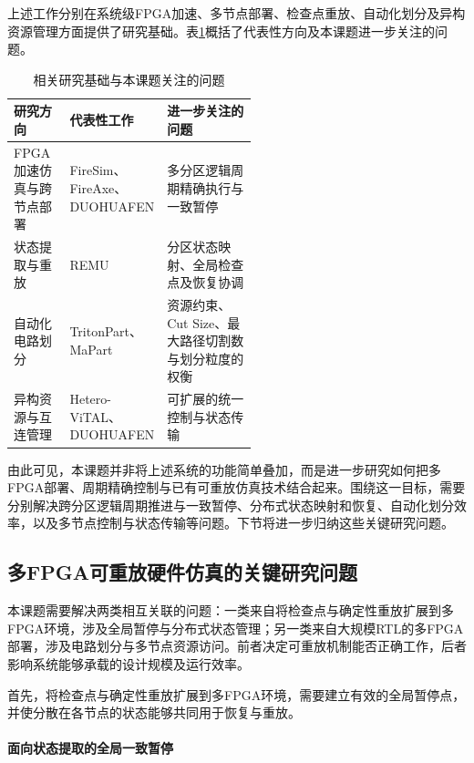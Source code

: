 上述工作分别在系统级FPGA加速、多节点部署、检查点重放、自动化划分及异构资源管理方面提供了研究基础。表\ref{tab:midterm-related-work}概括了代表性方向及本课题进一步关注的问题。

\begin{table}[htbp]
    \centering
    \caption{相关研究基础与本课题关注的问题}
    \label{tab:midterm-related-work}
    \small
    \renewcommand{\arraystretch}{1.25}
    \begin{tabularx}{\linewidth}{@{}>{\raggedright\arraybackslash}p{0.23\linewidth}>{\raggedright\arraybackslash}p{0.30\linewidth}>{\raggedright\arraybackslash}X@{}}
        \toprule
        研究方向 & 代表性工作 & 进一步关注的问题 \\
        \midrule
        FPGA加速仿真与跨节点部署 & FireSim、FireAxe、DUOHUAFEN & 多分区逻辑周期精确执行与一致暂停 \\
        状态提取与重放 & REMU & 分区状态映射、全局检查点及恢复协调 \\
        自动化电路划分 & TritonPart、MaPart & 资源约束、Cut Size、最大路径切割数与划分粒度的权衡 \\
        异构资源与互连管理 & Hetero-ViTAL、DUOHUAFEN & 可扩展的统一控制与状态传输 \\
        \bottomrule
    \end{tabularx}
\end{table}

由此可见，本课题并非将上述系统的功能简单叠加，而是进一步研究如何把多FPGA部署、周期精确控制与已有可重放仿真技术结合起来。围绕这一目标，需要分别解决跨分区逻辑周期推进与一致暂停、分布式状态映射和恢复、自动化划分效率，以及多节点控制与状态传输等问题。下节将进一步归纳这些关键研究问题。

\subsection{多FPGA可重放硬件仿真的关键研究问题}

本课题需要解决两类相互关联的问题：一类来自将检查点与确定性重放扩展到多FPGA环境，涉及全局暂停与分布式状态管理；另一类来自大规模RTL的多FPGA部署，涉及电路划分与多节点资源访问。前者决定可重放机制能否正确工作，后者影响系统能够承载的设计规模及运行效率。

首先，将检查点与确定性重放扩展到多FPGA环境，需要建立有效的全局暂停点，并使分散在各节点的状态能够共同用于恢复与重放。

\paragraph{面向状态提取的全局一致暂停}

